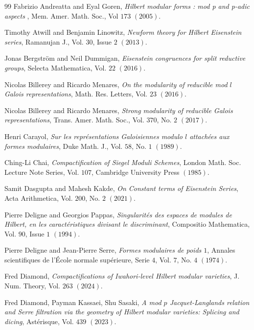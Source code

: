 \begin{thebibliography}{99}
Fabrizio Andreatta and Eyal Goren, \emph{Hilbert modular forms : mod p and p-adic aspects }, Mem. Amer. Math. Soc., Vol $173$ $(2005)$.

Timothy Atwill and Benjamin Linowitz, \emph{Newform theory for Hilbert Eisenstein series}, Ramanujan J., Vol. $30$, Issue $2$ $(2013)$.

Jonas Bergstr\"om and Neil Dummigan, \emph{Eisenstein congruences for split reductive groups}, Selecta Mathematica, Vol. $22$ $(2016)$.

Nicolas Billerey and Ricardo Menares, \emph{On the modularity of reducible mod $l$ Galois representations}, Math. Res. Letters, Vol. $23$ $(2016)$.

Nicolas Billerey and Ricardo Menares, \emph{Strong modularity of reducible Galois representations}, Trans. Amer. Math. Soc., Vol. $370$, No. $2$ $(2017)$.

Henri Carayol, \emph{Sur les repr\'esentations Galoisiennes modulo $l$ attach\'ees aux formes modulaires}, Duke Math. J., Vol. $58$, No. $1$ $(1989)$.

Ching-Li Chai, \emph{Compactification of Siegel Moduli Schemes}, London Math. Soc. Lecture Note Series, Vol. $107$, Cambridge University Press $(1985)$.

Samit Dasgupta and Mahesh Kakde,
\emph{On Constant terms of Eisenstein Series},
Acta Arithmetica, Vol. $200$, No. $2$ $(2021)$.

Pierre Deligne and Georgios Pappas, \emph{Singularit\'es des espaces de modules de Hilbert, en les caract\'eristiques divisant le discriminant}, Compositio Mathematica, Vol. $90$, Issue $1$ $(1994)$.

Pierre Deligne and Jean-Pierre Serre, \emph{Formes modulaires de poids $1$}, Annales scientifiques de l'\'Ecole
normale sup\'erieure, Serie $4$, Vol. $7$, No. $4$ $(1974)$.

Fred Diamond, \emph{Compactifications of Iwahori-level Hilbert modular varieties}, J. Num. Theory, Vol. $263$ $(2024)$.

Fred Diamond, Payman Kassaei, Shu Sasaki, \emph{A mod $p$ Jacquet-Langlands relation and Serre filtration via the geometry of Hilbert modular varieties: Splicing and dicing}, Ast\'erisque, Vol. $439$ $(2023)$.


\end{thebibliography}
